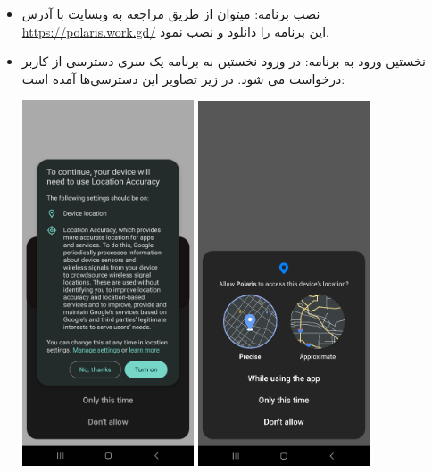 \begin{itemize}
	
	\item  نصب برنامه: میتوان از طریق مراجعه به وبسایت با آدرس \url{https://polaris.work.gd/} این برنامه را دانلود و نصب نمود.
	\item  نخستین ورود به برنامه: در ورود نخستین به برنامه یک سری دسترسی از کاربر درخواست می شود. در زیر تصاویر این دسترسی‌ها آمده است:
	\begin{center}
		\includegraphics[width=0.4\textwidth]{images/permission-location-1.jpg} 
		\includegraphics[width=0.4\textwidth]{images/permission-location-2.jpg} 

\end{center}
\end{itemize}
